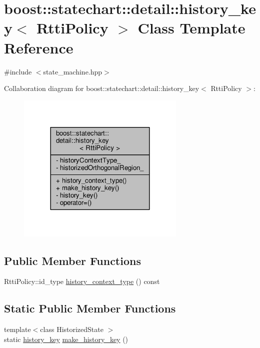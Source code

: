\hypertarget{classboost_1_1statechart_1_1detail_1_1history__key}{}\section{boost\+:\+:statechart\+:\+:detail\+:\+:history\+\_\+key$<$ Rtti\+Policy $>$ Class Template Reference}
\label{classboost_1_1statechart_1_1detail_1_1history__key}


{\ttfamily \#include $<$state\+\_\+machine.\+hpp$>$}



Collaboration diagram for boost\+:\+:statechart\+:\+:detail\+:\+:history\+\_\+key$<$ Rtti\+Policy $>$\+:
\nopagebreak
\begin{figure}[H]
\begin{center}
\leavevmode
\includegraphics[width=228pt]{classboost_1_1statechart_1_1detail_1_1history__key__coll__graph}
\end{center}
\end{figure}
\subsection*{Public Member Functions}
\begin{DoxyCompactItemize}
\item 
Rtti\+Policy\+::id\+\_\+type \mbox{\hyperlink{classboost_1_1statechart_1_1detail_1_1history__key_ad33ebdbbfa0830db8b63f16364254937}{history\+\_\+context\+\_\+type}} () const
\end{DoxyCompactItemize}
\subsection*{Static Public Member Functions}
\begin{DoxyCompactItemize}
\item 
{\footnotesize template$<$class Historized\+State $>$ }\\static \mbox{\hyperlink{classboost_1_1statechart_1_1detail_1_1history__key}{history\+\_\+key}} \mbox{\hyperlink{classboost_1_1statechart_1_1detail_1_1history__key_aefbb3ffada8c42f5c5f5a9e464341452}{make\+\_\+history\+\_\+key}} ()
\end{DoxyCompactItemize}
